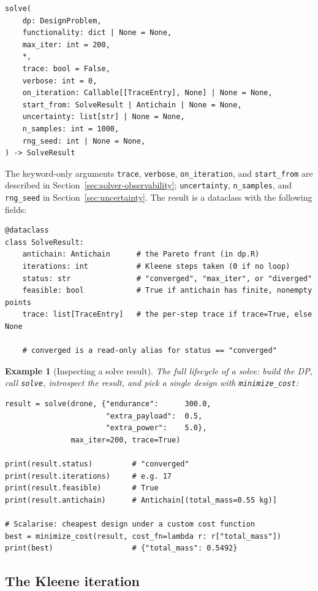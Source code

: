 \documentclass[11pt,a4paper]{article}
\newtheorem{example}[definition]{Example}
\begin{document}
\begin{lstlisting}
solve(
    dp: DesignProblem,
    functionality: dict | None = None,
    max_iter: int = 200,
    *,
    trace: bool = False,
    verbose: int = 0,
    on_iteration: Callable[[TraceEntry], None] | None = None,
    start_from: SolveResult | Antichain | None = None,
    uncertainty: list[str] | None = None,
    n_samples: int = 1000,
    rng_seed: int | None = None,
) -> SolveResult
\end{lstlisting}

The keyword-only arguments \texttt{trace}, \texttt{verbose},
\texttt{on\_iteration}, and \texttt{start\_from} are described in
Section~\ref{sec:solver-observability}; \texttt{uncertainty},
\texttt{n\_samples}, and \texttt{rng\_seed} in
Section~\ref{sec:uncertainty}. The result is a dataclass with the
following fields:
\begin{lstlisting}
@dataclass
class SolveResult:
    antichain: Antichain      # the Pareto front (in dp.R)
    iterations: int           # Kleene steps taken (0 if no loop)
    status: str               # "converged", "max_iter", or "diverged"
    feasible: bool            # True if antichain has finite, nonempty points
    trace: list[TraceEntry]   # the per-step trace if trace=True, else None

    # converged is a read-only alias for status == "converged"
\end{lstlisting}

\begin{example}[Inspecting a solve result]
The full lifecycle of a solve: build the DP, call \texttt{solve},
introspect the result, and pick a single design with
\texttt{minimize\_cost}:
\begin{lstlisting}
result = solve(drone, {"endurance":      300.0,
                       "extra_payload":  0.5,
                       "extra_power":    5.0},
               max_iter=200, trace=True)

print(result.status)         # "converged"
print(result.iterations)     # e.g. 17
print(result.feasible)       # True
print(result.antichain)      # Antichain[(total_mass=0.55 kg)]

# Scalarise: cheapest design under a custom cost function
best = minimize_cost(result, cost_fn=lambda r: r["total_mass"])
print(best)                  # {"total_mass": 0.5492}
\end{lstlisting}
\end{example}

\subsection{The Kleene iteration}
\end{document}
